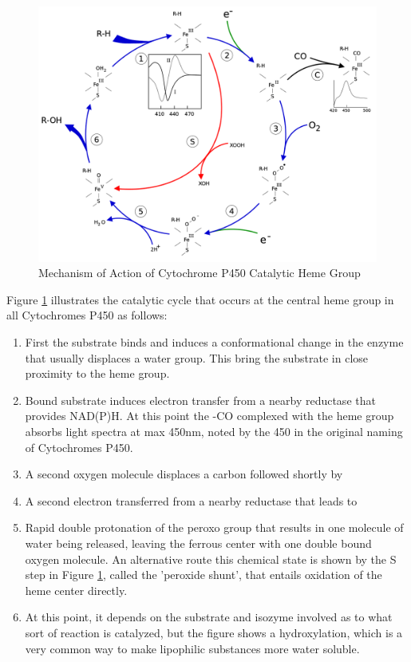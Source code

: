 \begin{figure}[H]
  \centering
   \includegraphics[width=1\textwidth]{../img/P450MOA.png}
  \caption{Mechanism of Action of Cytochrome P450 Catalytic Heme Group}
  \label{fig:P450MOA}
\end{figure}

Figure \ref{fig:P450MOA} illustrates the catalytic cycle that occurs at the central heme group in all Cytochromes P450 as follows:
\begin{enumerate}
\item First the substrate binds and induces a conformational change in the enzyme that usually displaces a water group. This bring the substrate in close proximity to the heme group.
\item Bound substrate induces electron transfer from a nearby reductase that provides NAD(P)H. At this point the -CO complexed with the heme group absorbs light spectra at max 450nm, noted by the 450 in the original naming of Cytochromes P450.
\item A second oxygen molecule displaces a carbon followed shortly by
\item A second electron transferred from a nearby reductase that leads to
\item Rapid double protonation of the peroxo group that results in one molecule of water being released, leaving the ferrous center with one double bound oxygen molecule. An alternative route this chemical state is shown by the S step in Figure \ref{fig:P450MOA}, called the 'peroxide shunt', that entails oxidation of the heme center directly.
\item At this point, it depends on the substrate and isozyme involved as to what sort of reaction is catalyzed, but the figure shows a hydroxylation, which is a very common way to make lipophilic substances more water soluble.
\end{enumerate}


